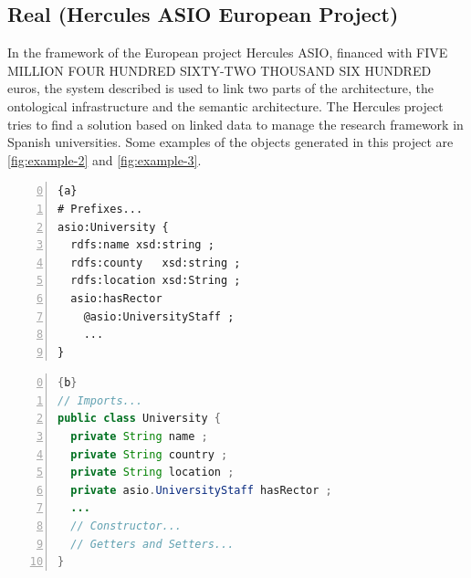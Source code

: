 \subsection{Real (Hercules ASIO European Project)}
In the framework of the European project Hercules ASIO, financed with FIVE MILLION FOUR HUNDRED SIXTY-TWO THOUSAND SIX HUNDRED
euros, the system described is used to link two parts of the architecture, the ontological infrastructure and the semantic 
architecture. The Hercules project tries to find a solution based on linked data to manage the research framework
in Spanish universities. Some examples of the objects generated in this project are \cref{fig:example-2} and \cref{fig:example-3}.

\begin{center}
	\noindent\begin{minipage}[t]{.4\textwidth}
		\begin{lstlisting}[frame=topline,numbers=left,firstnumber=0,title=\scriptsize\texttt{University.shexl}, basicstyle=\ttfamily\scriptsize]{a}
# Prefixes...
asio:University {
  rdfs:name xsd:string ;
  rdfs:county   xsd:string ;
  rdfs:location xsd:String ;
  asio:hasRector
    @asio:UniversityStaff ;
	...
}
		\end{lstlisting}
	\end{minipage}\hfill
	\begin{minipage}[t]{.5\textwidth}
		\begin{lstlisting}[language=Java, frame=t,numbers=left,firstnumber=0,title=\scriptsize\texttt{University.java}, basicstyle=\ttfamily\scriptsize]{b}
// Imports...
public class University {
  private String name ;
  private String country ;
  private String location ;
  private asio.UniversityStaff hasRector ;
  ...
  // Constructor...
  // Getters and Setters...
}
		\end{lstlisting}
	\end{minipage}
	\label{fig:example-2}
\end{center}

